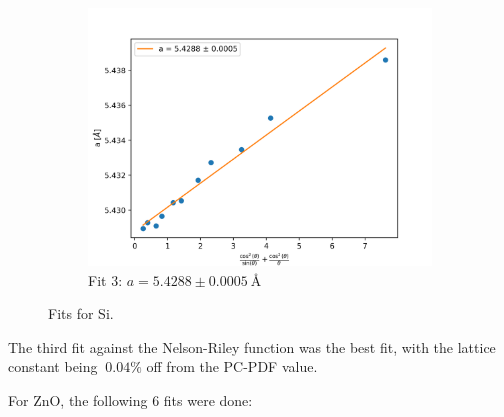 \documentclass{article}
\begin{document}
\begin{figure}[h]
\begin {subfigure}{0.3\textwidth}
		\includegraphics[width=\textwidth]{Figures/SiNelson.png}
		\caption{Fit 3: $a=5.4288 \pm  \SI{0.0005}{\angstrom} $}
		\label{fig:SiFit3}
	\end{subfigure}
	\caption{Fits for Si.}
	\label{fig:SiFits}
\end{figure}

The third fit against the Nelson-Riley function was the best fit, with the lattice constant being $~ 0.04 \%$ off from the PC-PDF value.



For ZnO, the following 6 fits were done:
\end{document}
